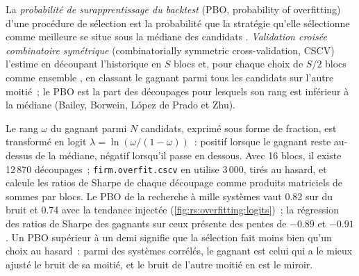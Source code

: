 \begin{definition}\label{def:rs:overfitting:pbo}
La \emph{probabilité de surapprentissage du backtest} (PBO, probability of  overfitting) d'une procédure de sélection est la probabilité que la
stratégie qu'elle sélectionne comme meilleure  se situe sous la médiane des candidats . \emph{Validation croisée
combinatoire symétrique} (combinatorially symmetric cross-validation, CSCV) l'estime en découpant l'historique en $S$ blocs et, pour chaque choix de
$S/2$ blocs comme ensemble , en classant le gagnant  parmi tous les candidats sur l'autre moitié~; le PBO est la part des découpages pour lesquels son rang
est inférieur à la médiane (Bailey, Borwein, López de Prado et Zhu).
\end{definition}

Le rang $\omega$ du gagnant parmi $N$ candidats, exprimé sous forme de fraction, est transformé en logit $\lambda = \ln(\omega/(1 - \omega))$~: positif lorsque le gagnant
reste au-dessus de la médiane, négatif lorsqu'il passe en dessous. Avec 16 blocs, il existe 12\,870 découpages~; \texttt{firm.overfit.cscv} en utilise 3\,000, tirés au
hasard, et calcule les ratios de Sharpe de chaque découpage comme produits matriciels de sommes par blocs. Le PBO de la recherche à mille systèmes vaut 0.82 sur du bruit et 0.74 avec la
tendance injectée (\cref{fig:rs:overfitting:logits})~; la régression des ratios de Sharpe  des gagnants sur ceux  présente des pentes de $-0.89$
et $-0.91$. Un PBO supérieur à un demi signifie que la sélection fait moins bien qu'un choix au hasard~: parmi des systèmes corrélés, le gagnant  est celui qui a le mieux ajusté
le bruit de sa moitié, et le bruit de l'autre moitié en est le miroir.

